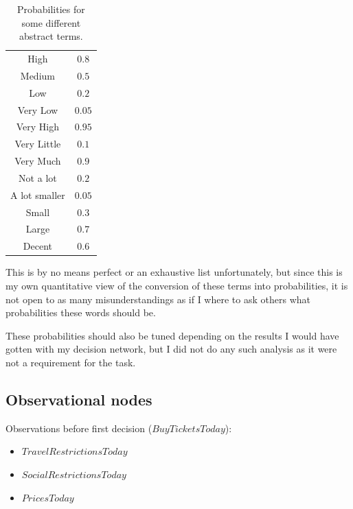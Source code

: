 \documentclass[11pt, a4paper, english]{../Template/NTNUoving}
\begin{document}
\begin{oppgave}
    \begin{table}[H]
        \centering
        \begin{tabular}{|c|c|}
            \hline
            High & $0.8$   \\ [1.0ex]
            Medium & $0.5$   \\ [1.0ex]
            Low & $0.2$   \\ [1.0ex]
            Very Low & $0.05$   \\ [1.0ex]
            Very High & $0.95$   \\ [1.0ex]
            Very Little & $0.1$   \\ [1.0ex]
            Very Much & $0.9$   \\ [1.0ex]
            Not a lot & $0.2$   \\ [1.0ex]
            A lot smaller & $0.05$   \\ [1.0ex]
            Small & $0.3$   \\ [1.0ex]
            Large & $0.7$   \\ [1.0ex]
            Decent & $0.6$   \\ [1.0ex]
            \hline
    \end{tabular}
        \caption{Probabilities for some different abstract terms. }
        \label{tab:prob}
    \end{table}

    This is by no means perfect or an exhaustive list unfortunately, but since this is my own quantitative view of the conversion of these terms into
    probabilities, it is not open to as many misunderstandings as if I where to ask others what probabilities these words should be.

    These probabilities should also be tuned depending on the results I would have gotten with my decision network,
    but I did not do any such analysis as it were not a requirement for the task.


    \subsection{Observational nodes}

    Observations before first decision ($BuyTicketsToday$):
    \begin{itemize}
        \item $TravelRestrictionsToday$
        \item $SocialRestrictionsToday$
        \item $PricesToday$
    \end{itemize}


\end{oppgave}
\end{document}
